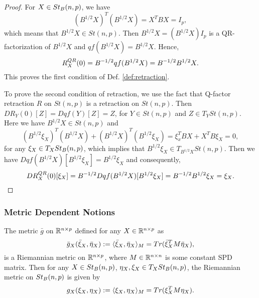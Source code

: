 \documentclass[11pt,a4paper]{article}
\begin{document}
\begin{proof}
For $X\in St_B(n,p)$, we have
\begin{equation*}
(B^{1/2}X)^T(B^{1/2}X) = X^TBX = I_p,
\end{equation*}
which means that $B^{1/2}X\in St(n,p)$. Then $B^{1/2}X = (B^{1/2}X) I_p$ is a QR-factorization of $B^{1/2}X$ and $qf(B^{1/2}X) = B^{1/2}X$. Hence,
\begin{equation*}
R^{QR}_X(0) = B^{-1/2}qf(B^{1/2}X) = B^{-1/2}B^{1/2}X.
\end{equation*}
This proves the first condition of Def. \ref{def:retraction}. 

To prove the second condition of retraction, we use the fact that Q-factor retraction $R$ on $St(n,p)$ is a retraction on $St(n,p)$. Then $DR_Y(0)[Z] = Dqf(Y)[Z] = Z$, for $Y\in St(n,p)$ and $Z\in T_YSt(n,p)$. Here we have $B^{1/2}X\in St(n,p)$ and 
\begin{equation*}
(B^{1/2}\xi_X)^T(B^{1/2}X) + (B^{1/2}X)^T(B^{1/2}\xi_X) = \xi_x^TBX + X^TB\xi_X = 0,
\end{equation*}
for any $\xi_X\in T_XSt_B(n,p)$, which implies that $B^{1/2}\xi_X\in T_{B^{1/2}X}St(n,p)$. Then we have $Dqf(B^{1/2}X)[B^{1/2}\xi_X] = B^{1/2}\xi_X$ and consequently,
\begin{equation*}
DR^{QR}_X(0)[\xi_X] = B^{-1/2}Dqf(B^{1/2}X)[B^{1/2}\xi_X] = B^{-1/2}B^{1/2}\xi_X = \xi_X.
\end{equation*}
\end{proof}

\subsubsection{Metric Dependent Notions}

\begin{proposition} \label{prop:preconditioned_metric}
The metric $\bar{g}$ on $\mathbb{R}^{n\times p}$ defined for any $X\in \mathbb{R}^{n\times p}$ as
\begin{equation*}
\bar{g}_X(\bar{\xi}_X,\bar{\eta}_X) := \langle \bar{\xi}_X, \bar{\eta}_X \rangle_M = Tr(\bar{\xi}_X^TM\bar{\eta}_X),
\end{equation*}
is a Riemannian metric on $\mathbb{R}^{n\times p}$, where $M\in\mathbb{R}^{n\times n}$ is some constant SPD matrix. Then for any $X\in St_B(n,p)$, $\eta_X,\xi_X\in T_XSt_B(n,p)$, the Riemannian metric on $St_B(n,p)$ is given by
\begin{equation}
g_X(\xi_X,{\eta}_X) := \langle {\xi}_X, {\eta}_X \rangle_M = Tr({\xi}_X^TM{\eta}_X).
\end{equation}
\end{proposition}
\end{document}
